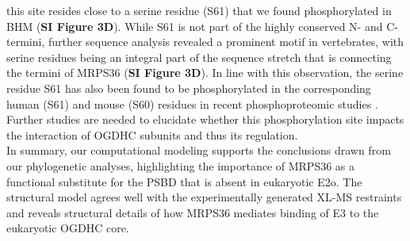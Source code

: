 \documentclass[times, twoside]{zHenriquesLab-StyleBioRxiv}
\begin{document}
this site resides close to a serine residue (S61) that we found phosphorylated in BHM (\textbf{SI Figure 3D}). While S61 is not part of the highly conserved N- and C-termini, further sequence analysis revealed a prominent motif in vertebrates, with serine residues being an integral part of the sequence stretch that is connecting the termini of MRPS36 (\textbf{SI Figure 3D}). In line with this observation, the serine residue S61 has also been found to be phosphorylated in the corresponding human (S61) and mouse (S60) residues in recent phosphoproteomic studies \cite{Mertins_2016, Sharma_2014, Wilson-Grady_2013}. Further studies are needed to elucidate whether this phosphorylation site impacts the interaction of OGDHC subunits and thus its regulation.\\
In summary, our computational modeling supports the conclusions drawn from our phylogenetic analyses, highlighting the importance of MRPS36 as a functional substitute for the PSBD that is absent in eukaryotic E2o. The structural model agrees well with the experimentally generated XL-MS restraints and reveals structural details of how MRPS36 mediates binding of E3 to the eukaryotic OGDHC core.
\end{document}
